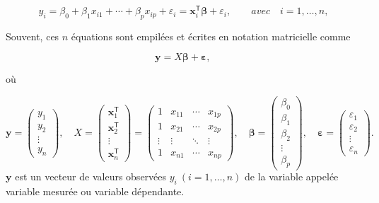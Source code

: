 	$${\displaystyle y_{i}=\beta _{0}+\beta _{1}x_{i1}+\cdots +\beta _{p}x_{ip}+\varepsilon _{i}=\mathbf { x} _{i}^{\mathsf {T}}{\boldsymbol {\beta }}+\varepsilon_{i},\qquad avec \quad i=1,\ldots ,n,}
	$$
	
	Souvent, ces $n$ équations sont empilées et écrites en notation matricielle comme
	
	$$
	{\displaystyle \mathbf {y} =X{\boldsymbol {\beta }}+{\boldsymbol {\varepsilon}},\,}
	$$
	
	où
	
	$
	\mathbf{y} ={\begin{pmatrix}y_{1}\\y_{2}\\\vdots \\y_{n}\end{pmatrix}},\quad
	{\displaystyle 
		X={
			\begin{pmatrix}
				\mathbf {x} _{1}^{\mathsf {T}}\\
				\mathbf {x} _{2}^{\mathsf {T}}\\
				\vdots \\
				\mathbf {x} _{n}^{\mathsf {T}}
			\end{pmatrix}}={
			\begin{pmatrix}
				1&x_{11}&\cdots &x_{1p}\\
				1&x_{21} &\cdots &x_{2p}\\
				\vdots &\vdots &\ddots &\vdots \\
				1&x_{n1}&\cdots &x_{np}
			\end{pmatrix}},} \quad
	{\displaystyle {\boldsymbol {\beta }}={
			\begin{pmatrix}
				\beta _{0}\\
				\beta _{1}\\
				\beta _{2}\\
				\vdots \\
				\beta _{p}
			\end{pmatrix}},\quad 
	{\boldsymbol {\varepsilon }}={
		\begin{pmatrix}\varepsilon _{1}\\
			\varepsilon _{2}\\
			\vdots \\
			\varepsilon _{ n}
		\end{pmatrix}}.}$ \\

	$\mathbf{y}$ est un vecteur de valeurs observées ${\displaystyle y_{i}\ (i=1,\ldots ,n)}$ de la variable appelée variable mesurée ou variable dépendante.
	
